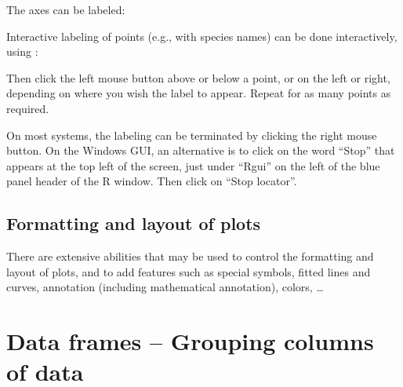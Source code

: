 The axes can be labeled:
\begin{knitrout}
\color{fgcolor}\begin{kframe}
\begin{alltt}
 \hlopt{~}  \hlstd{=}\hlstd{,} \hlstd{=}\hlstd{,}
     \hlstd{=}\hlstd{,} \hlstd{=}\hlstd{)}
\end{alltt}
\end{kframe}
\end{knitrout}

Interactive labeling of points   (e.g., with species names) can
be done interactively, using :
\begin{knitrout}
\color{fgcolor}\begin{kframe}
\begin{alltt}
 \hlopt{~}  
\end{alltt}
\end{kframe}
\end{knitrout}
Then click the left mouse button above or below a point, or on the
left or right, depending on where you wish the label to appear.
Repeat for as many points as required.

On most systems, the labeling can be terminated by clicking the right
mouse button.  On the Windows GUI, an alternative is to click on the
word ``Stop'' that appears at the top left
of the screen, just under ``Rgui'' on the left of the blue panel
header of the R window. Then click on ``Stop locator''.

\subsection*{Formatting and layout of plots}
There are extensive abilities that may be used to control
the formatting and layout of plots, and to add features such as
special symbols, fitted lines and curves, annotation (including
mathematical annotation), colors, \ldots

\section{Data frames -- Grouping columns of data}\label{sec:df}

